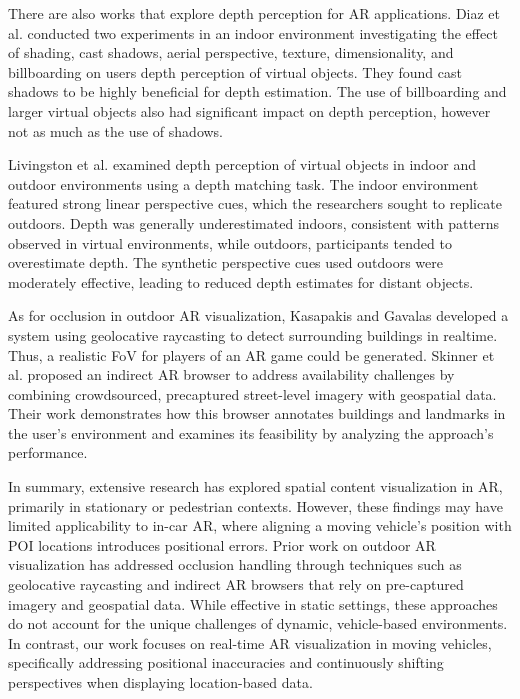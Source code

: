There are also works that explore depth perception for AR applications. Diaz et al. \cite{Diaz2017depthPerception} conducted two experiments in an indoor environment investigating the effect of shading, cast shadows, aerial perspective, texture, dimensionality, and billboarding on users depth perception of virtual objects. They found cast shadows to be highly beneficial for depth estimation. The use of billboarding and larger virtual objects also had significant impact on depth perception, however not as much as the use of shadows. 

Livingston et al. \cite{Livingston2009IndoorOutdoorAr} examined depth perception of virtual objects in indoor and outdoor environments using a depth matching task. The indoor environment featured strong linear perspective cues, which the researchers sought to replicate outdoors. Depth was generally underestimated indoors, consistent with patterns observed in virtual environments, while outdoors, participants tended to overestimate depth. The synthetic perspective cues used outdoors were moderately effective, leading to reduced depth estimates for distant objects.

As for occlusion in outdoor AR visualization, Kasapakis and Gavalas \cite{kasapakis2017occlusion} developed a system using geolocative raycasting to detect surrounding buildings in realtime. Thus, a realistic FoV for players of an AR game could be generated. Skinner et al. \cite{Skinner2018IndirectPoiBrowser} proposed an indirect AR browser to address availability challenges by combining crowdsourced, precaptured street-level imagery with geospatial data. Their work demonstrates how this browser annotates buildings and landmarks in the user's environment and examines its feasibility by analyzing the approach's performance.


In summary, extensive research has explored spatial content visualization in AR, primarily in stationary or pedestrian contexts. However, these findings may have limited applicability to in-car AR, where aligning a moving vehicle's position with POI locations introduces positional errors. Prior work on outdoor AR visualization has addressed occlusion handling through techniques such as geolocative raycasting and indirect AR browsers that rely on pre-captured imagery and geospatial data. While effective in static settings, these approaches do not account for the unique challenges of dynamic, vehicle-based environments. In contrast, our work focuses on real-time AR visualization in moving vehicles, specifically addressing positional inaccuracies and continuously shifting perspectives when displaying location-based data.